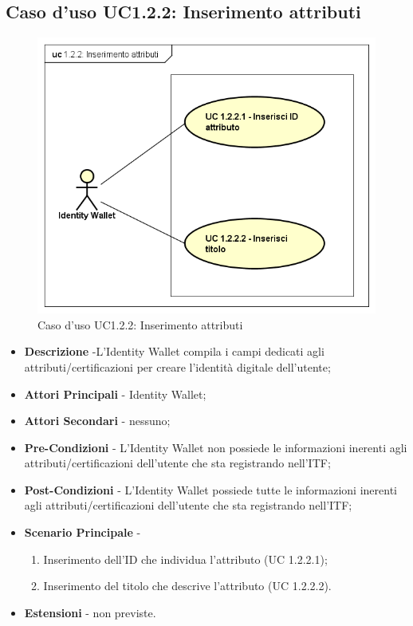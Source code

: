 \subsection{Caso d'uso UC1.2.2: Inserimento attributi}
\begin{figure}[h]
	\centering
	\includegraphics[scale=0.50]{immagini/usecase/UC122_InserimentoAttributi}
	\caption{Caso d'uso UC1.2.2: Inserimento attributi}
\end{figure}
\begin{itemize}
	\item \textbf{Descrizione} -L'Identity Wallet compila i campi dedicati agli attributi/certificazioni per creare l'identità digitale dell'utente;
	\item \textbf{Attori Principali} - Identity Wallet;
	\item \textbf{Attori Secondari} - nessuno;
	\item \textbf{Pre-Condizioni} - L'Identity Wallet non possiede le informazioni inerenti agli attributi/certificazioni dell'utente che sta registrando nell'\gls{ITF};
	\item \textbf{Post-Condizioni} - L'Identity Wallet possiede tutte le informazioni inerenti agli attributi/certificazioni dell'utente che sta registrando nell'\gls{ITF};
	\item \textbf{Scenario Principale} -
	\begin{enumerate}
		\item Inserimento dell'ID che individua l'attributo (UC 1.2.2.1);
		\item Inserimento del titolo che descrive l'attributo (UC 1.2.2.2).
	\end{enumerate}
	\item \textbf{Estensioni} - non previste.
\end{itemize}
\newpage
